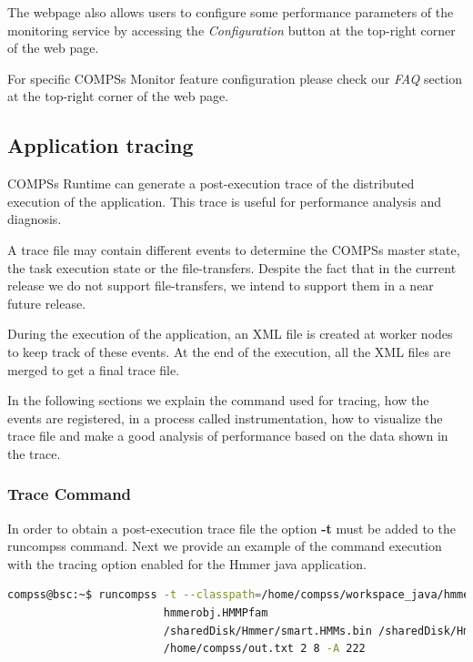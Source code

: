 
The webpage also allows users to configure some performance parameters of the monitoring service by accessing the 
\textit{Configuration} button at the top-right corner of the web page. 

For specific COMPSs Monitor feature configuration please check our \textit{FAQ} section at the top-right corner of the web page. 


\subsection{Application tracing}
\label{sec:Tracing}
COMPSs Runtime can generate a post-execution trace of the distributed execution of the application. This trace is useful for
performance analysis and diagnosis.

A trace file may contain different events to determine the COMPSs master state, the task execution state or the file-transfers.
Despite the fact that in the current release we do not support file-transfers, we intend to support them in a near future release.

During the execution of the application, an XML file is created at worker nodes to keep track of 
these events. At the end of the execution, all the XML files are merged to get a final trace file.

In the following sections we explain the command used for tracing, how the events are registered, 
in a process called instrumentation, how to visualize the trace file and make a good analysis of 
performance based on the data shown in the trace.

\subsubsection{Trace Command}
In order to obtain a post-execution trace file the option \textbf{-t}  must be added to the runcompss command. Next we provide an
example of the command execution with the tracing option enabled for the Hmmer java application.
\begin{lstlisting}[language=bash]
compss@bsc:~$ runcompss -t --classpath=/home/compss/workspace_java/hmmerobj/jar/hmmerobj.jar 
                        hmmerobj.HMMPfam 
                        /sharedDisk/Hmmer/smart.HMMs.bin /sharedDisk/Hmmer/256seq 
                        /home/compss/out.txt 2 8 -A 222
\end{lstlisting}
 

